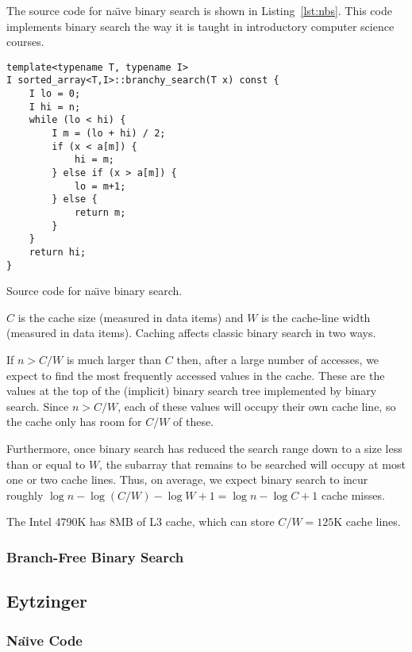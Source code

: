 \documentclass{patmorin}
\newcommand{\lstlabel}[1]{\label{lst:#1}}
\newcommand{\lstref}[1]{Listing~\ref{lst:#1}}
\begin{document}
The source code for na\"{\i}ve binary search is shown in
\lstref{nbs}. This code implements binary search the way it is taught
in introductory computer science courses.

\begin{listing}
\begin{verbatim}
template<typename T, typename I>
I sorted_array<T,I>::branchy_search(T x) const {
    I lo = 0;
    I hi = n;
    while (lo < hi) {
        I m = (lo + hi) / 2;
        if (x < a[m]) {
            hi = m;
        } else if (x > a[m]) {
            lo = m+1;
        } else {
            return m;
        }
    }
    return hi;
}
\end{verbatim}
\caption{Source code for na\"{\i}ve binary search.}
\lstlabel{nbs}
\end{listing}


$C$ is the cache size (measured in data items) and $W$ is the cache-line width (measured in data items).  Caching affects classic binary search in two ways.

If $n> C/W$ is much larger than $C$ then, after a large number of
accesses, we expect to find the most frequently accessed values in the
cache.  These are the values at the top of the (implicit) binary search
tree implemented by binary search.  Since $n>C/W$, each of these values
will occupy their own cache line, so the cache only has room for $C/W$
of these.

Furthermore, once binary search has reduced the search range down
to a size less than or equal to $W$, the subarray that remains to be
searched will occupy at most one or two cache lines. Thus, on average,
we expect binary search to incur roughly $\log n -\log(C/W) - \log W + 1 =
\log n - \log C + 1$ cache misses. 

The Intel 4790K has 8MB of L3 cache, which can store $C/W=125$K cache lines.



\subsubsection{Branch-Free Binary Search}

\subsection{Eytzinger}

\subsubsection{Na\"{\i}ve Code}
\end{document}

